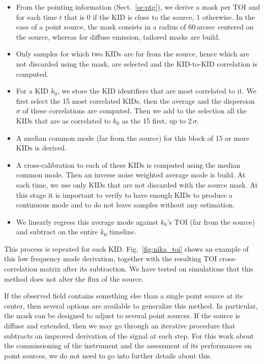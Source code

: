 \begin{itemize}
\item From the pointing information (Sect.~\ref{se:ptg}), we derive a mask per TOI
  and for each time $t$ that is 0 if the KID is close to the source, 1
  otherwise. In the case of a point source, the mask consists in 
    a radius of 60\,arcsec centered on the source, whereas for
    diffuse emission, tailored masks are build.
\item Only samples for which two KIDs are far from the source,
  hence which are not discarded using the mask, are selected and the KID-to-KID
  correlation is computed.
\item For a KID $k_0$, we store the KID identifiers that are most
  correlated to it. We first select the 15 most correlated KIDs, then 
  the average and the dispersion $\sigma$ of these correlations are
  computed. Then we add to the selection all the KIDs that are as correlated to $k_0$ as the
  15 first, up to $2\,\sigma$.
\item A median common mode (far from the source) for this block of 15
  or more KIDs is derived.
\item A cross-calibration to each of these KIDs is computed using the
  median common mode. Then an inverse noise weighted average mode is build. At each time, we use
  only KIDs that are not discarded with the source mask.
  At this stage it is important to verify to have enough KIDs to produce a
  continuous mode and to do not leave samples without any estimation.
\item We linearly regress this average mode against $k_0$'s TOI (far from the
  source) and subtract on the entire $k_0$ timeline.
\end{itemize}

This process is repeated for each KID. Fig.~\ref{fig:nika_toi} shows an example
of this low frequency mode derivation, together with the resulting TOI
cross-correlation matrix after its subtraction. We have tested on simulations
that this method does not alter the flux of the
source.

If the observed field contains something else than a single point source at its
center, then several options are available to generalize this method. In
particular, the mask can be designed to adjust to several point sources. If the
source is diffuse and extended, then we may go through an iterative procedure that
subtracts an improved derivation of the signal at each step. For this work about
the commissioning of the instrument and the assessment of its performances on
point sources, we do not need to go into further details about this.

